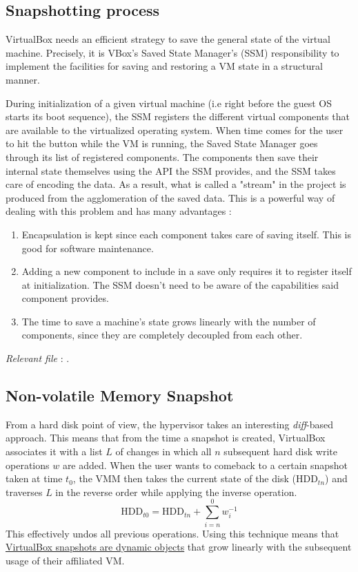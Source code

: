 \subsection*{Snapshotting process}

VirtualBox needs an efficient strategy to save the general state of the virtual machine. Precisely, it is VBox's Saved State Manager's (SSM) responsibility to implement the facilities for saving and restoring a VM state in a structural manner.

During initialization of a given virtual machine (i.e right before the guest OS starts its boot sequence), the SSM registers the different virtual components that are available to the virtualized operating system. When time comes for the user to hit the  button while the VM is running, the Saved State Manager goes through its list of registered components. The components then save their internal state themselves using the API the SSM provides, and the SSM takes care of encoding the data. As a result, what is called a "stream" in the project is produced from the agglomeration of the saved data. This is a powerful way of dealing with this problem and has many advantages :
\begin{enumerate}
	\item Encapsulation is kept since each component takes care of saving itself. This is good for software maintenance.
	\item Adding a new component to include in a save only requires it to register itself at initialization. The SSM doesn't need to be aware of the capabilities said component provides.
	\item The time to save a machine's state grows linearly with the number of components, since they are completely decoupled from each other.
\end{enumerate}

\hfill\textit{Relevant file }: .

\subsection*{Non-volatile Memory Snapshot}

From a hard disk point of view, the hypervisor takes an interesting \textit{diff}-based approach. This means that from the time a snapshot is created, VirtualBox associates it with a list $L$ of changes in which all $n$  subsequent hard disk write operations $w$ are added. When the user wants to comeback to a certain snapshot taken at time $t_0$, the \gls{VMM} then takes the current state of the disk ($\text{HDD}_{tn}$) and traverses $L$ in the reverse order while applying the inverse operation.
\[
\text{HDD}_{t0} = \text{HDD}_{tn} + \sum_{i=n}^{0}w_i^{-1}
\]
This effectively undos all previous operations. Using this technique means that \ul{VirtualBox snapshots are dynamic objects} that grow linearly with the subsequent usage of their affiliated VM.


